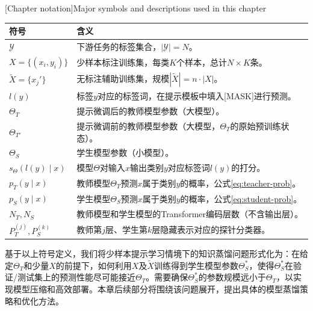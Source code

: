 \documentclass[../main.tex]{subfiles}
\begin{document}
\begin{table}[htbp]
	\centering
	[Chapter notation]{Major symbols and descriptions used in this chapter}
	\label{tab:ch3-notation}
	\small\begin{tabular}{ll}
		\toprule[1pt]
		符号                       & 含义                                                       \\
		\midrule[0.5pt]
		$\mathcal{Y}$            & 下游任务的标签集合，$|\mathcal{Y}|=N$。                             \\
		$X = \{(x_i, y_i)\}$     & 少样本标注训练集，每类$K$个样本，总计$N \times K$条。                       \\
		$\tilde{X} = \{x_j'\}$   & 无标注辅助训练集，规模$|\tilde{X}| = n \cdot |X|$。                  \\
		$l(y)$                   & 标签$y$对应的标签词，在提示模板中填入[MASK]进行预测。                          \\
		$\Theta_T$               & 提示微调后的教师模型参数（大模型）。                                       \\
		$\Theta_{T'}$            & 提示微调前的教师模型参数（大模型，$\Theta_T$的原始预训练状态）。                    \\
		$\Theta_S$               & 学生模型参数（小模型）。                                             \\
		$s_{\Theta}(l(y)\mid x)$ & 模型$\Theta$对输入$x$输出类别$y$对应标签词$l(y)$的打分。                   \\
		$p_T(y\mid x)$           & 教师模型$\Theta_T$预测$x$属于类别$y$的概率，公式\eqref{eq:teacher-prob}。 \\
		$p_S(y\mid x)$           & 学生模型$\Theta_S$预测$x$属于类别$y$的概率，公式\eqref{eq:student-prob}。 \\
		$N_T, N_S$               & 教师模型和学生模型的Transformer编码层数（不含输出层）。                        \\
		$P_T^{(j)}, P_S^{(k)}$   & 教师第$j$层、学生第$k$层隐藏表示对应的探针分类器。                             \\
		\bottomrule[1pt]
	\end{tabular}
\end{table}

基于以上符号定义，我们将少样本提示学习情境下的知识蒸馏问题形式化为：在给定$\Theta_T$和少量$X$的前提下，如何利用$X$及$\tilde{X}$训练得到学生模型参数$\Theta_S^*$，使得$\Theta_S^*$在验证/测试集上的预测性能尽可能接近$\Theta_T$。需要确保$\Theta_S^*$的参数规模远小于$\Theta_T$，以实现模型压缩和高效部署。本章后续部分将围绕该问题展开，提出具体的模型蒸馏策略和优化方法。
\end{document}
